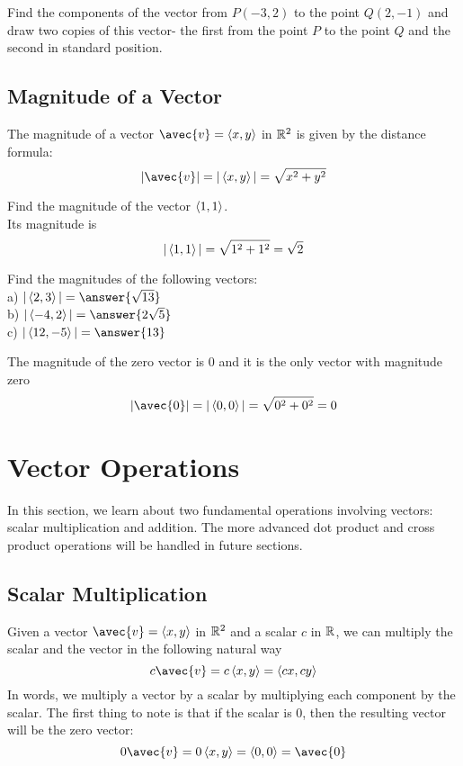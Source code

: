 \documentclass[handout]{ximera}
\begin{document}
\begin{problem}
Find the components of the vector from $P(-3, 2)$ to the point $Q(2, -1)$ and draw two copies of this vector- the first from the point $P$ to the point $Q$
and the second in standard position.\\
\end{problem}


\subsection{Magnitude of a Vector}

The magnitude of a vector $\avec{v} = \vector{x,y}$ in $\mathbb R^2$ is given by the distance formula:
\[
|\avec{v}| = |\vector{x,y}| = \sqrt{x^2 +y^2}
\]

\begin{example}
Find the magnitude of the vector $\left\langle 1,1\right\rangle$.\\
Its magnitude is
\[
|\left\langle 1,1\right\rangle| = \sqrt{1^2 +1^2} = \sqrt 2
\]
\end{example}

\begin{problem}
Find the magnitudes of the following vectors:\\
a) $|\vector{2,3}| = \answer{\sqrt{13}}$\\
b) $|\vector{-4,2}| = \answer{2\sqrt{5}}$\\
c) $|\vector{12,-5}| = \answer{13}$
\end{problem}

The magnitude of the zero vector is $0$ and it is the only vector with magnitude zero
\[
|\avec{0}| = |\vector{0,0}| = \sqrt{0^2 +0^2} = 0
\]

\section{Vector Operations}
In this section, we learn about two fundamental operations involving vectors: scalar multiplication and addition.
The more advanced dot product and cross product operations will be handled in future sections.

\subsection{Scalar Multiplication}
Given a vector $\avec{v} = \vector{x,y}$ in $\mathbb R^2$ and a scalar $c$ in $\mathbb R$, we can multiply the scalar and the vector in the following
natural way
\[
c\avec{v} = c\vector{x,y} = \vector{cx,cy}
\]
In words, we multiply a vector by a scalar by multiplying each component by the scalar.
The first thing to note is that if the scalar is 0, then the resulting vector will be the zero vector:
\[
0\avec{v} = 0\vector{x,y} = \vector{0,0} = \avec{0}
\]
\end{document}
